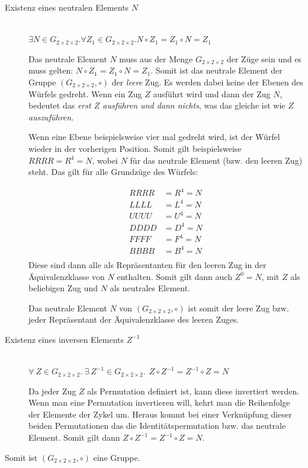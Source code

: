 \documentclass[12pt,a4paper, usenames, dvipsnames]{article}
\theoremstyle{mystyle}
\theoremstyle{definition}
\newcommand{\Gtwo}{\ensuremath{G_{2\times 2\times 2}}}
\begin{document}
\begin{description}
\item [Existenz eines neutralen Elements $N$] \ \\
$\exists N \in \Gtwo. \forall Z_1 \in \Gtwo .N \circ Z_1 = Z_1 \circ N = Z_1$ 


Das neutrale Element $N$ muss aus der Menge $\Gtwo$ der Züge sein und es muss gelten: $N \circ Z_1 = Z_1 \circ N = Z_1$. Somit ist das neutrale Element der Gruppe $(\Gtwo, \circ)$ der \textit{leere} Zug. Es werden dabei keine der Ebenen des Würfels gedreht. Wenn ein Zug $Z$ ausführt wird und dann der Zug $N$, bedeutet das \textit{erst $Z$ ausführen und dann nichts}, was das gleiche ist wie \textit{$Z$ auszuführen}.


Wenn eine Ebene beispielsweise vier mal gedreht wird, ist der Würfel wieder in der vorherigen Position. Somit gilt beispielsweise $RRRR=R^4=N$, wobei $N$ für das neutrale Element (bzw. den leeren Zug) steht. Das gilt für alle Grundzüge des Würfels:

\begin{align*}
RRRR & =R^4 =N \\
LLLL & =L^4 =N \\
UUUU & =U^4 =N \\
DDDD & =D^4 =N \\
FFFF & =F^4 =N \\
BBBB & =B^4 =N \\
\end{align*}
Diese sind dann alle als Repräsentanten für den leeren Zug in der Äquivalenzklasse von $N$ enthalten.
Somit gilt dann auch $Z^0=N$, mit $Z$ als beliebigen Zug und $N$ als neutrales Element. 

Das neutrale Element $N$ von $(\Gtwo, \circ)$ ist somit der leere Zug bzw. jeder Repräsentant der Äquivalenzklasse des leeren Zuges.


\item [Existenz eines inversen Elements $Z^{-1}$] \ \\
$\forall \  Z \in \Gtwo.\ \exists \  Z^{-1} \in \Gtwo.  \ \ Z \circ Z^{-1} = Z^{-1} \circ Z = N$  


Da jeder Zug $Z$ als Permutation definiert ist, kann diese invertiert werden. Wenn man eine Permutation invertieren will, kehrt man die Reihenfolge der Elemente der Zykel um. Heraus kommt bei einer Verknüpfung dieser beiden Permutationen das die Identitätspermutation bzw. das neutrale Element.
Somit gilt dann $Z \circ Z^{-1} = Z^{-1} \circ Z = N$.
\end{description}
Somit ist $(\Gtwo, \circ)$ eine Gruppe. 
\end{document}
